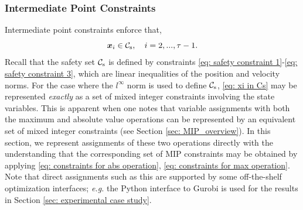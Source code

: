\documentclass[twocolumn,letterpaper]{IEEEAerospaceCLS}  %
\theoremstyle{definition}
\begin{document}


\subsubsection{Intermediate Point Constraints}
Intermediate point constraints enforce that,
\begin{equation} \label{eq: xi in Cs}
  \boldsymbol{x}_i \in {\mathcal{C}}_{\rm s}, \quad i=2, ... , \tau-1. 
\end{equation}
Recall that the safety set ${\mathcal{C}}_{\rm s}$ is defined by constraints \eqref{eq: safety constraint 1}-\eqref{eq: safety constraint 3}, which are linear inequalities of the position and velocity norms. 
For the case where the $l^\infty$ norm is used to define ${\mathcal{C}}_{\rm s}$,
\eqref{eq: xi in Cs} may be represented \emph{exactly} as a set of mixed integer constraints involving the state variables. 
This is apparent when one notes that variable assignments with both the maximum and absolute value operations can be represented by an equivalent set of mixed integer constraints (see Section \ref{sec: MIP_overview}).
In this section, we represent assignments of these two operations directly with the understanding that the corresponding set of MIP constraints may be obtained by applying \eqref{eq: constraints for abs operation}, \eqref{eq: constraints for max operation}. 
Note that direct assignments such as this are supported by some off-the-shelf optimization interfaces; \emph{e.g.} the Python interface to Gurobi \cite{optimization2014inc} is used for the results in Section \ref{sec: experimental case study}. 
\end{document}
